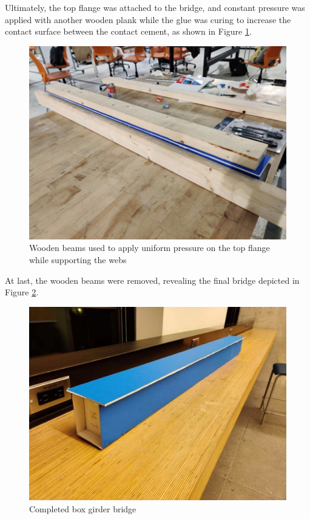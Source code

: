\documentclass[11pt]{article}
\newcommand{\imagewidth}{.5\linewidth}
\begin{document}
Ultimately, the top flange was attached to the bridge, and constant pressure was applied with another wooden plank while the glue was curing to increase the contact surface between the contact cement, as shown in Figure \ref{c11}.

\begin{figure}[h]
    \centering
    \includegraphics[width=\imagewidth]{img/construction_11.png}
    \caption{Wooden beams used to apply uniform pressure on the top flange while supporting the webs}
    \label{c11}
\end{figure}

At last, the wooden beams were removed, revealing the final bridge depicted in Figure \ref{c12}.

\begin{figure}[h]
    \centering
    \includegraphics[width=\imagewidth]{img/construction_12.jpg}
    \caption{Completed box girder bridge}
    \label{c12}
\end{figure}
\end{document}
